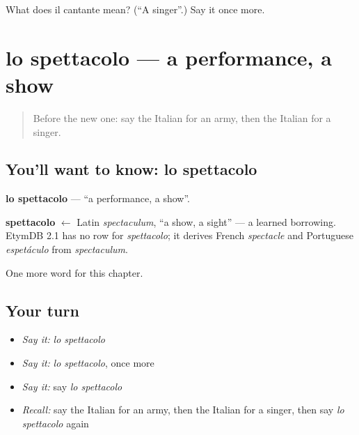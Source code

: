 \begin{tcolorbox}[breakable,colback=teal!4,colframe=teal!35!black,title={Before you move on}]
What does il cantante mean? (\textquotedblleft{}A singer\textquotedblright{}.) Say it once more.
\end{tcolorbox}
\section[lo spettacolo]{lo spettacolo — a performance, a show}

\label{lesson:IT-C194-spettacolo}



\begin{quote}
Before the new one: say the Italian for an army, then the Italian for a singer.
\end{quote}

\subsection*{You'll want to know: lo spettacolo}
\textbf{lo spettacolo} — \textquotedblleft{}a performance, a show\textquotedblright{}.

\begin{cousinweb}
\textbf{spettacolo} $\leftarrow$ Latin \emph{spectaculum}, \textquotedblleft{}a show, a sight\textquotedblright{} — a learned borrowing. EtymDB 2.1 has no row for \emph{spettacolo}; it derives French \emph{spectacle} and Portuguese \emph{espetáculo} from \emph{spectaculum}.
\end{cousinweb}

\begin{grammarlens}[title={What you've built}]
One more word for this chapter.
\end{grammarlens}

\subsection*{Your turn}
\begin{itemize}
\raggedright
  \item \emph{Say it:} \emph{lo spettacolo}
  \item \emph{Say it:} \emph{lo spettacolo}, once more
  \item \emph{Say it:} say \emph{lo spettacolo}
  \item \emph{Recall:} say the Italian for an army, then the Italian for a singer, then say \emph{lo spettacolo} again
\end{itemize}

